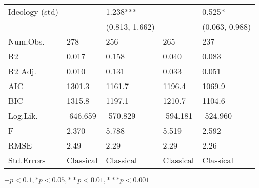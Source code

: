 \begin{table}[th!]
\begin{threeparttable}
\begin{tabular}{lC{3cm}C{3cm}C{3cm}C{3cm}}
 Ideology (std) &                 &                1.238*** &                 &                   0.525* \\
                &                 &          (0.813, 1.662) &                 &           (0.063, 0.988) \\
       Num.Obs. &             278 &                     256 &             265 &                      237 \\
             R2 &           0.017 &                   0.158 &           0.040 &                    0.083 \\
        R2 Adj. &           0.010 &                   0.131 &           0.033 &                    0.051 \\
            AIC &          1301.3 &                  1161.7 &          1196.4 &                   1069.9 \\
            BIC &          1315.8 &                  1197.1 &          1210.7 &                   1104.6 \\
       Log.Lik. &        -646.659 &                -570.829 &        -594.181 &                 -524.960 \\
              F &           2.370 &                   5.788 &           5.519 &                    2.592 \\
           RMSE &            2.49 &                    2.29 &            2.29 &                     2.26 \\
     Std.Errors &       Classical &               Classical &       Classical &                Classical \\
\bottomrule
\end{tabular}
\begin{tablenotes}
\item \footnotesize $+ p < 0.1, * p < 0.05, ** p < 0.01, *** p < 0.001$
\end{tablenotes}
\end{threeparttable}
\end{table}
